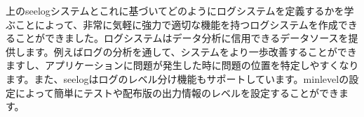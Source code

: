 上のseelogシステムとこれに基づいてどのようにログシステムを定義するかを学ぶことによって、非常に気軽に強力で適切な機能を持つログシステムを作成できることができました。ログシステムはデータ分析に信用できるデータソースを提供します。例えばログの分析を通して、システムをより一歩改善することができますし、アプリケーションに問題が発生した時に問題の位置を特定しやすくなります。また、seelogはログのレベル分け機能もサポートしています。minlevelの設定によって簡単にテストや配布版の出力情報のレベルを設定することができます。
